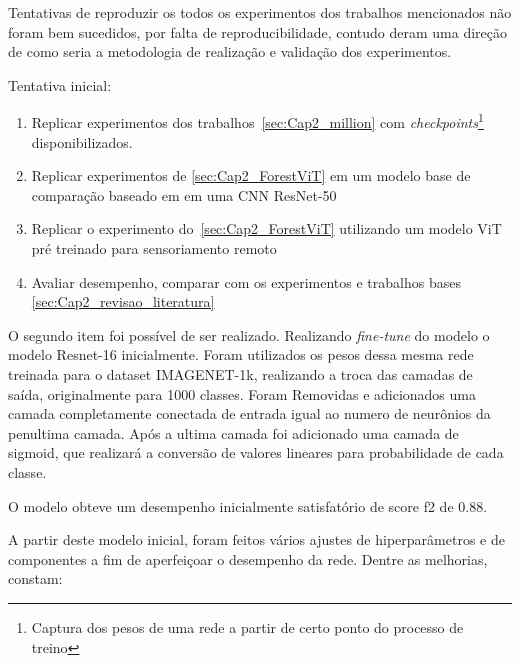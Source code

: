 Tentativas de reproduzir os todos os experimentos dos trabalhos mencionados não foram bem sucedidos, por falta de reproducibilidade, contudo deram uma direção de como seria a metodologia de realização e validação dos experimentos.

Tentativa inicial:

\begin{enumerate}
    \item  Replicar experimentos dos trabalhos~\ref{sec:Cap2_million} com \textit{checkpoints}\footnote{Captura dos pesos de uma rede a partir de certo ponto do processo de treino} disponibilizados. 
    \item  Replicar experimentos de \ref{sec:Cap2_ForestViT} em um modelo base de comparação baseado em em uma CNN ResNet-50
    \item  Replicar o experimento do~\ref{sec:Cap2_ForestViT} utilizando um modelo ViT pré treinado para sensoriamento remoto
    \item Avaliar desempenho, comparar com os experimentos e trabalhos bases \ref{sec:Cap2_revisao_literatura}
    \end{enumerate}

O segundo item foi possível de ser realizado. Realizando \textit{fine-tune} do modelo o modelo Resnet-16 inicialmente. Foram utilizados os pesos dessa mesma rede treinada para o dataset IMAGENET-1k, realizando a troca das camadas de saída, originalmente para 1000 classes. Foram Removidas e adicionados uma camada completamente conectada de entrada igual ao numero de neurônios da penultima camada. Após a ultima camada foi adicionado uma camada de sigmoid, que realizará a conversão de valores lineares para probabilidade de cada classe.

O modelo obteve um desempenho inicialmente satisfatório de score f2 de 0.88.

A partir deste modelo inicial, foram feitos vários ajustes de hiperparâmetros e de componentes a fim de aperfeiçoar o desempenho da rede. Dentre as melhorias, constam:

